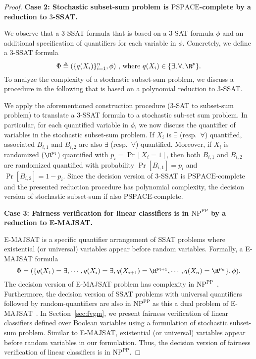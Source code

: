 \begin{proof}
			\textbf{Case 2: Stochastic subset-sum problem is $ \mathrm{PSPACE} $-complete by a reduction to $ 3 $-SSAT.}
			
			We observe that a $ 3 $-SSAT formula that is based on a $ 3 $-SAT formula $ \phi $ and an additional specification of quantifiers for each variable in $ \phi $. Concretely, we define a $ 3 $-SSAT formula $$ \Phi \triangleq (\{q(X_i)\}_{i=1}^{n}, \phi) \text{ , where } q(X_i) \in \{\exists, \forall, \R^{p}\} .$$ To analyze the complexity of a stochastic subset-sum problem, we discuss a procedure in the following that is based on a polynomial reduction to $ 3 $-SSAT.
			
			
			We apply the aforementioned construction procedure ($ 3 $-SAT to subset-sum problem) to translate  a $ 3 $-SSAT formula to a stochastic sub-set sum problem. In particular, for each quantified variable in $ \phi $, we now discuss the quantifier of variables in the stochastic subset-sum problem.  If $ X_i $ is $ \exists $ (resp.\ $ \forall $) quantified, associated $ B_{i,1} $ and $ B_{i,2} $ are also $ \exists $ (resp.\ $ \forall $) quantified. Moreover, if $ X_i $ is randomized ($ \R^{p_i} $) quantified with $ p_i = \Pr[X_i = 1] $, then both $ B_{i,1} $ and $ B_{i,2} $ are randomized quantified with probability $ \Pr[B_{i,1}] = p_i $ and $ \Pr[B_{i,2}] = 1 - p_i $. Since the decision version of $ 3 $-SSAT is $ \mathrm{PSPACE} $-complete~\cite{littman2001stochastic}  and the presented reduction procedure has polynomial complexity, the decision version of stochastic subset-sum if also $ \mathrm{PSPACE} $-complete. 
			
			\textbf{Case 3: Fairness verification for linear classifiers is in
			$\mathrm{NP^{PP}}$ by a reduction to E-MAJSAT.}
		
		
			
			E-MAJSAT is a specific quantifier arrangement of SSAT problems where existential (or universal) variables appear before random variables. Formally, a E-MAJSAT formula 
			$$ \Phi =  (\{q(X_1) = \exists,\cdots,q(X_i) =\exists, q(X_{i+1}) =\R^{p_{i+1}}, \cdots, q(X_n) = \R^{p_{n}} \}, \phi).$$ The decision version of E-MAJSAT problem has complexity in $\mathrm{NP^{PP}}$~\cite{littman2001stochastic}. Furthermore, the decision version of SSAT problems with universal quantifiers followed by random-quantifiers are also in $\mathrm{NP^{PP}}$ as this a dual problem of E-MAJSAT~\cite{littman2001stochastic}. 
			In Section~\ref{sec:fvgm}, we present fairness verification of linear classifiers defined over Boolean variables using a formulation of stochastic subset-sum problem. Similar to E-MAJSAT,  existential (or universal) variables appear before random variables in our formulation.  Thus, the decision version of fairness verification of linear classifiers is in $\mathrm{NP^{PP}}$.
			\iffalse 
			\red{We further highlight that verification of linear classifiers on continuous real-valued variables is at least as hard as verifying classifiers on Boolean variables.}\fi
		\end{proof}
		\fi
	
